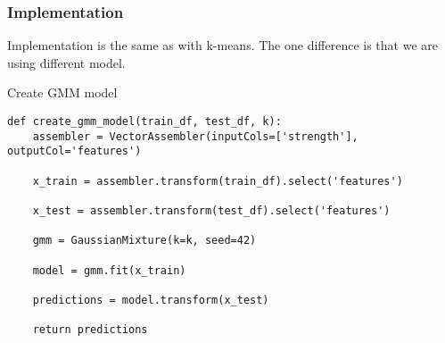 \subsubsection{Implementation}

Implementation is the same as with k-means. The one difference is that we are using different model.
\begin{listing}[H]
\caption{Create GMM model}
\begin{verbatim}
def create_gmm_model(train_df, test_df, k):
    assembler = VectorAssembler(inputCols=['strength'], outputCol='features')

    x_train = assembler.transform(train_df).select('features')

    x_test = assembler.transform(test_df).select('features')

    gmm = GaussianMixture(k=k, seed=42)

    model = gmm.fit(x_train)

    predictions = model.transform(x_test)

    return predictions
\end{verbatim}
\end{listing}